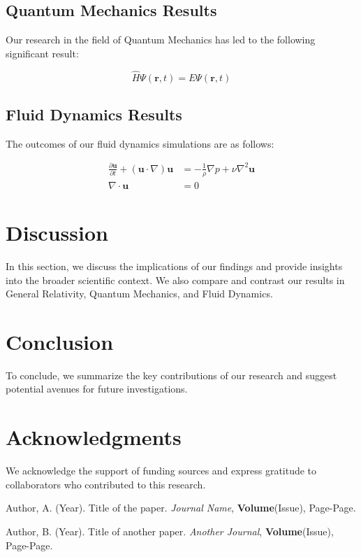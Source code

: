 \documentclass{article}
\begin{document}
\subsection{Quantum Mechanics Results}
Our research in the field of Quantum Mechanics has led to the following significant result:

\begin{equation}
    \hat{H}\Psi(\mathbf{r}, t) = E\Psi(\mathbf{r}, t)
\end{equation}

\subsection{Fluid Dynamics Results}
The outcomes of our fluid dynamics simulations are as follows:

\begin{align}
    \frac{\partial \mathbf{u}}{\partial t} + (\mathbf{u} \cdot \nabla)\mathbf{u} &= -\frac{1}{\rho}\nabla p + \nu\nabla^2\mathbf{u} \\
    \nabla \cdot \mathbf{u} &= 0
\end{align}

\section{Discussion}
In this section, we discuss the implications of our findings and provide insights into the broader scientific context. We also compare and contrast our results in General Relativity, Quantum Mechanics, and Fluid Dynamics.

\section{Conclusion}
To conclude, we summarize the key contributions of our research and suggest potential avenues for future investigations.

\section*{Acknowledgments}
We acknowledge the support of funding sources and express gratitude to collaborators who contributed to this research.

\begin{thebibliography}{9}
Author, A. (Year). Title of the paper. \textit{Journal Name}, \textbf{Volume}(Issue), Page-Page.

Author, B. (Year). Title of another paper. \textit{Another Journal}, \textbf{Volume}(Issue), Page-Page.
\end{thebibliography}
\end{document}
